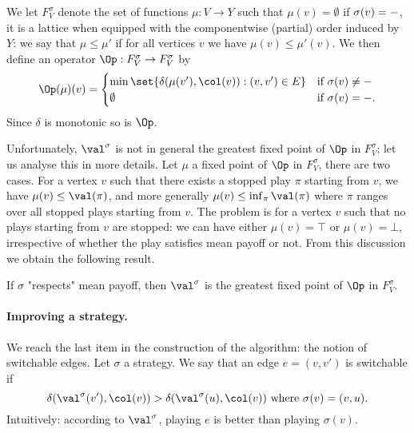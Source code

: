 We let $F^\sigma_V$ denote the set of functions $\mu : V \to Y$ such that $\mu(v) = \emptyset$ if $\sigma(v) = \mathtt{-}$,
it is a lattice when equipped with the componentwise (partial) order induced by $Y$:
we say that $\mu \le \mu'$ if for all vertices $v$ we have $\mu(v) \le \mu'(v)$.
We then define an operator $\Op : F^\sigma_V \to F^\sigma_V$ by
\[
\Op(\mu)(v) = 
\begin{cases}
\min \set{\delta( \mu(v'), \col(v)) : (v,v') \in E} & \text{if } \sigma(v) \neq \siblank \\
\emptyset 											& \text{if } \sigma(v) = \siblank.
\end{cases}
\]
Since $\delta$ is monotonic so is $\Op$.

\begin{fact}[Fixed point]\label{4-fact:fixed-point]
The function $\val^\sigma$ is a fixed point of $\Op$ in $F^\sigma_V$.
\end{fact}
Unfortunately, $\val^{\sigma}$ is not in general the greatest fixed point of $\Op$ in $F^\sigma_V$;
let us analyse this in more details.
Let $\mu$ a fixed point of $\Op$ in $F^\sigma_V$, there are two cases. 
For a vertex $v$ such that there exists a stopped play $\pi$ starting from $v$, we have $\mu(v) \le \val(\pi)$, and more generally
$\mu(v) \le \inf_{\pi} \val(\pi)$ where $\pi$ ranges over all stopped plays starting from $v$.
The problem is for a vertex $v$ such that no plays starting from $v$ are stopped: 
we can have either $\mu(v) = \top$ or $\mu(v) = \bot$, irrespective of whether the play satisfies mean payoff or not.
From this discussion we obtain the following result.

\begin{lemma}
\label{4-lem:greatest_fixed_point}
If $\sigma$ "respects" mean payoff, then $\val^{\sigma}$ is the greatest fixed point of $\Op$ in $F^\sigma_V$.
\end{lemma}

\paragraph{\bf Improving a strategy.}
We reach the last item in the construction of the algorithm: the notion of switchable edges.
Let $\sigma$ a strategy. We say that an edge $e = (v,v')$ is switchable if 
\[
\delta(\val^{\sigma}(v'),\col(v)) > \delta(\val^{\sigma}(u),\col(v)) \text{ where } \sigma(v) = (v,u).
\]
Intuitively: according to $\val^{\sigma}$, playing $e$ is better than playing $\sigma(v)$.

